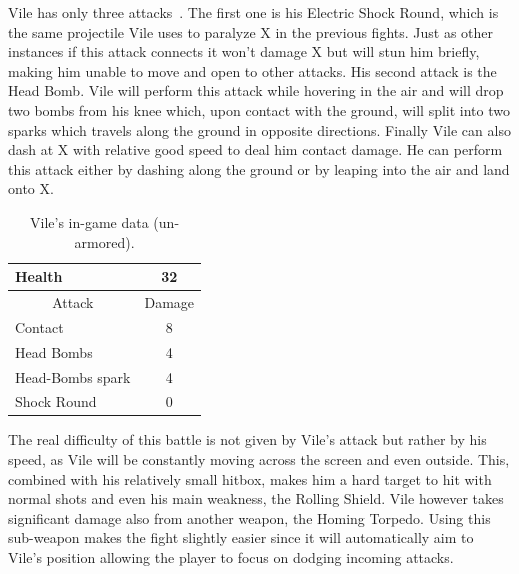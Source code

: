 Vile has only three attacks~\cite{wiki:Vile}. The first one is his Electric Shock Round, which is the same projectile Vile uses to paralyze X in the previous fights. Just as other instances if this attack connects it won't damage X but will stun him briefly, making him unable to move and open to other attacks. His second attack is the Head Bomb. Vile will perform this attack while hovering in the air and will drop two bombs from his knee which, upon contact with the ground, will split into two sparks which travels along the ground in opposite directions. Finally Vile can also dash at X with relative good speed to deal him contact damage. He can perform this attack either by dashing along the ground or by leaping into the air and land onto X.

\begin{table}
	\centering
	\begin{tabular}[htp]{l c}
		\toprule
		Health  & 32\\
		\midrule
		\multicolumn{1}{c}{Attack} & \multicolumn{1}{c}{Damage}\\
		Contact & 8\\
		Head Bombs & 4\\
		Head-Bombs spark & 4\\
		Shock Round & 0\\
		\bottomrule
	\end{tabular}
	\caption{Vile's in-game data (un-armored). }
\end{table}


The real difficulty of this battle is not given by Vile's attack but rather by his speed, as Vile will be constantly moving across the screen and even outside. This, combined with his relatively small hitbox, makes him a hard target to hit with normal shots and even his main weakness, the Rolling Shield. Vile however takes significant damage also from another weapon, the Homing Torpedo. Using this sub-weapon makes the fight slightly easier since it will automatically aim to Vile's position allowing the player to focus on dodging incoming attacks.

